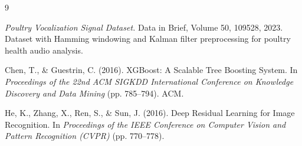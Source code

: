 \documentclass[12pt,a4paper]{report}
\begin{document}
\clearpage
{}
\begin{thebibliography}{9}

\textit{Poultry Vocalization Signal Dataset.} Data in Brief, Volume 50, 109528, 2023. Dataset with Hamming windowing and Kalman filter preprocessing for poultry health audio analysis.

Chen, T., \& Guestrin, C. (2016). XGBoost: A Scalable Tree Boosting System. In \emph{Proceedings of the 22nd ACM SIGKDD International Conference on Knowledge Discovery and Data Mining} (pp. 785--794). ACM.

He, K., Zhang, X., Ren, S., \& Sun, J. (2016). Deep Residual Learning for Image Recognition. In \emph{Proceedings of the IEEE Conference on Computer Vision and Pattern Recognition (CVPR)} (pp. 770--778).

\end{thebibliography}
\end{document}
